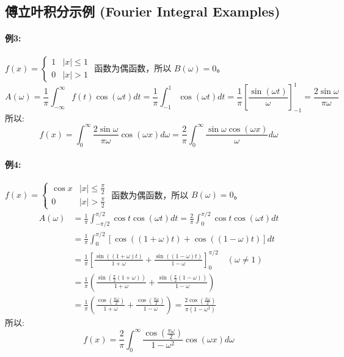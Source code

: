 \documentclass{article}
\begin{document}
	\subsection{傅立叶积分示例 (Fourier Integral Examples)}
	\paragraph{例3:} $f(x) = \begin{cases} 1 & |x| \le 1 \\ 0 & |x| > 1 \end{cases}$
	函数为偶函数，所以 $B(\omega)=0$。
	$$ 
	A(\omega) = \frac{1}{\pi} \int_{-\infty}^\infty f(t)\cos(\omega t) dt = \frac{1}{\pi} \int_{-1}^1 \cos(\omega t) dt = \frac{1}{\pi} \left[\frac{\sin(\omega t)}{\omega}\right]_{-1}^1 = \frac{2\sin\omega}{\pi\omega} 
	$$
	所以:
	$$ 
	f(x) = \int_0^\infty \frac{2\sin\omega}{\pi\omega} \cos(\omega x) d\omega = \frac{2}{\pi} \int_0^\infty \frac{\sin\omega \cos(\omega x)}{\omega} d\omega 
	$$
	
	\paragraph{例4:} $f(x) = \begin{cases} \cos x & |x| \le \frac{\pi}{2} \\ 0 & |x| > \frac{\pi}{2} \end{cases}$
	函数为偶函数，所以 $B(\omega)=0$。
	\begin{align*}
		A(\omega) &= \frac{1}{\pi} \int_{-\pi/2}^{\pi/2} \cos t \cos(\omega t) dt = \frac{2}{\pi} \int_0^{\pi/2} \cos t \cos(\omega t) dt \\
		&= \frac{1}{\pi} \int_0^{\pi/2} [\cos((1+\omega)t) + \cos((1-\omega)t)] dt \\
		&= \frac{1}{\pi} \left[ \frac{\sin((1+\omega)t)}{1+\omega} + \frac{\sin((1-\omega)t)}{1-\omega} \right]_0^{\pi/2} \quad (\omega \ne 1) \\
		&= \frac{1}{\pi} \left( \frac{\sin(\frac{\pi}{2}(1+\omega))}{1+\omega} + \frac{\sin(\frac{\pi}{2}(1-\omega))}{1-\omega} \right) \\
		&= \frac{1}{\pi} \left( \frac{\cos(\frac{\pi\omega}{2})}{1+\omega} + \frac{\cos(\frac{\pi\omega}{2})}{1-\omega} \right) = \frac{2\cos(\frac{\pi\omega}{2})}{\pi(1-\omega^2)}
	\end{align*}
	所以:
	$$ 
	f(x) = \frac{2}{\pi} \int_0^\infty \frac{\cos(\frac{\pi\omega}{2})}{1-\omega^2} \cos(\omega x) d\omega 
	$$
	
\end{document}
